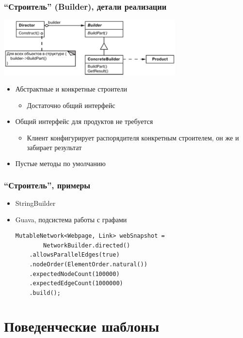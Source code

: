 \documentclass[xetex,mathserif,serif]{beamer}
\begin{document}
	\begin{frame}
		\frametitle{``Строитель'' (Builder), детали реализации}
		\begin{center}
			\includegraphics[width=0.7\textwidth]{builder.png}
		\end{center}
		\begin{itemize}
			\item Абстрактные и конкретные строители
			\begin{itemize}
				\item Достаточно общий интерфейс
			\end{itemize}
			\item Общий интерфейс для продуктов не требуется
			\begin{itemize}
				\item Клиент конфигурирует распорядителя конкретным строителем, он же и забирает результат
			\end{itemize}
			\item Пустые методы по умолчанию
		\end{itemize}
	\end{frame}

	\begin{frame}[fragile]
		\frametitle{``Строитель'', примеры}
		\begin{itemize}
			\item StringBuilder
			\item Guava, подсистема работы с графами
			\begin{verbatim}
MutableNetwork<Webpage, Link> webSnapshot = 
        NetworkBuilder.directed()
    .allowsParallelEdges(true)
    .nodeOrder(ElementOrder.natural())
    .expectedNodeCount(100000)
    .expectedEdgeCount(1000000)
    .build();
			\end{verbatim}
		\end{itemize}
	\end{frame}

	\section{Поведенческие шаблоны}
\end{document}
